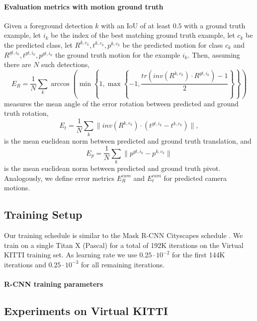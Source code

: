 \paragraph{Evaluation metrics with motion ground truth}
Given a foreground detection $k$ with an IoU of at least $0.5$ with a ground truth example,
let $i_k$ be the index of the best matching ground truth example,
let $c_k$ be the predicted class,
let $R^{k,c_k}, t^{k,c_k}, p^{k,c_k}$ be the predicted motion for class $c_k$
and $R^{gt,i_k}, t^{gt,i_k}, p^{gt,i_k}$ the ground truth motion for the example $i_k$.
Then, assuming there are $N$ such detections,
\begin{equation}
E_{R} = \frac{1}{N}\sum_k \arccos\left( \min\left\{1, \max\left\{-1, \frac{tr(inv(R^{k,c_k}) \cdot R^{gt,i_k}) - 1}{2} \right\}\right\} \right)
\end{equation}
measures the mean angle of the error rotation between predicted and ground truth rotation,
\begin{equation}
E_{t} = \frac{1}{N}\sum_k  \lVert inv(R^{k,c_k}) \cdot (t^{gt,i_k} - t^{k,c_k}) \rVert,
\end{equation}
is the mean euclidean norm between predicted and ground truth translation, and
\begin{equation}
E_{p} = \frac{1}{N}\sum_k \lVert p^{gt,i_k} - p^{k,c_k} \rVert
\end{equation}
is the mean euclidean norm between predicted and ground truth pivot.
Analogously, we define error metrics $E_{R}^{cam}$ and $E_{t}^{cam}$ for
predicted camera motions.

\subsection{Training Setup}
Our training schedule is similar to the Mask R-CNN Cityscapes schedule \cite{MaskRCNN}.
We train on a single Titan X (Pascal) for a total of 192K iterations on the
Virtual KITTI training set. As learning rate we use $0.25 \cdot 10^{-2}$ for the
first 144K iterations and $0.25 \cdot 10^{-3}$ for all remaining iterations.

\paragraph{R-CNN training parameters}

\subsection{Experiments on Virtual KITTI}

